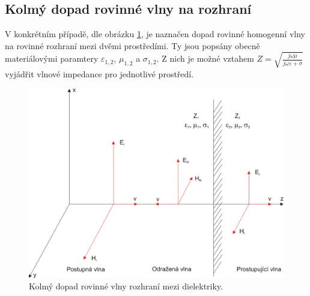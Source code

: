 \subsection{Kolmý dopad rovinné vlny na rozhraní} \label{subsec:kolmy_dopad}
V konkrétním případě, dle obrázku \ref{obr:evlny_dielektricke_rozhrani}, je naznačen dopad rovinné homogenní vlny na rovinné rozhraní mezi dvěmi prostředími. Ty jsou popsány obecně materiálovými paramtery $\varepsilon_{1,2}$, $\mu_{1,2}$ a $\sigma_{1,2}$. Z nich je možné vztahem $Z=\sqrt{\frac{j\omega\mu}{j\omega\varepsilon + \sigma}}$ vyjádřit vlnové impedance pro jednotlivé prostředí.

\begin{figure}[!h]
	\centering
	\includegraphics[width=13.5cm]{evlny_dielektricke_rozhrani.png}
	\caption{Kolmý dopad rovinné vlny rozhraní mezi dielektriky.}
	\label{obr:evlny_dielektricke_rozhrani}
\end{figure}

